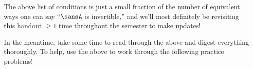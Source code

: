\documentclass[12 pt]{article}
\begin{document}
\vspace{3mm}\noindent The above list of conditions is just a small fraction of the number of equivalent ways one can say ``$\sansA$ is invertible,'' and we'll most definitely be revisiting this handout $\geq 1$ time throughout the semester to make updates!

In the meantime, take some time to read through the above and digest everything thoroughly. To help, use the above to work through the following practice problems!
\end{document}
